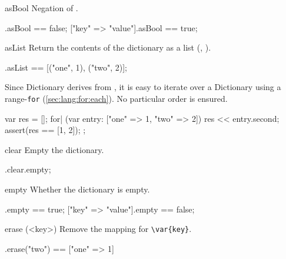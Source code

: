 \begin{urbiscriptapi}
\item[asBool]
  Negation of .
\begin{urbiassert}
[=>].asBool == false;
["key" => "value"].asBool == true;
\end{urbiassert}

\item[asList]
  Return the contents of the dictionary as a  list
  (, ).

\begin{urbiassert}
["one" => 1, "two" => 2].asList == [("one", 1), ("two", 2)];
\end{urbiassert}

  \noindent
  Since Dictionary derives from , it is easy
  to iterate over a Dictionary using a range-\lstinline|for|
  (\autoref{sec:lang:for:each}).  No particular order is ensured.
\begin{urbiscript}
{
  var res = [];
  for| (var entry: ["one" => 1, "two" => 2])
    res << entry.second;
  assert(res == [1, 2]);
};
\end{urbiscript}

\item[clear]
  Empty the dictionary.

\begin{urbiassert}
["one" => 1].clear.empty;
\end{urbiassert}

\item[empty]
  Whether the dictionary is empty.

\begin{urbiassert}
[=>].empty == true;
["key" => "value"].empty == false;
\end{urbiassert}

\item[erase](<key>)
  Remove the mapping for \lstinline|\var{key}|.

\begin{urbiassert}
["one" => 1, "two" => 2].erase("two") == ["one" => 1]
\end{urbiassert}




\end{urbiscriptapi}
